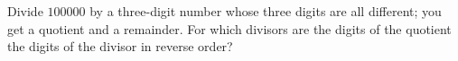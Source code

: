 Divide $100000$ by a three-digit number whose three digits are all different; you get a quotient and a remainder. For which divisors are the digits of the quotient the digits of the divisor in reverse order?
